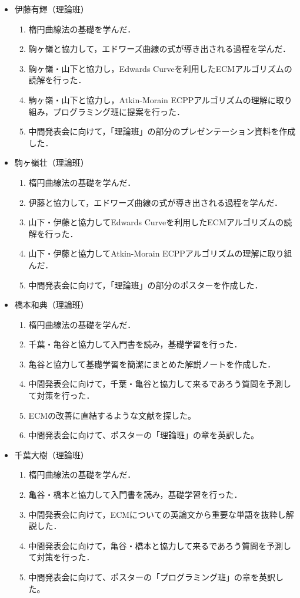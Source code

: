 \documentclass[openany,11pt,papersize]{jsbook}
\begin{document}
\begin{itemize}
\item 伊藤有輝（理論班）
 \begin{enumerate}
 \renewcommand{\labelenumi}{(\arabic{enumi})}
 \item 楕円曲線法の基礎を学んだ．
 \item 駒ヶ嶺と協力して，エドワーズ曲線の式が導き出される過程を学んだ．
 \item 駒ヶ嶺・山下と協力し，Edwards Curveを利用したECMアルゴリズムの読解を行った．
 \item 駒ヶ嶺・山下と協力し，Atkin-Morain ECPPアルゴリズムの理解に取り組み，プログラミング班に提案を行った．
 \item 中間発表会に向けて，「理論班」の部分のプレゼンテーション資料を作成した．
 \end{enumerate}
 
\item 駒ヶ嶺壮（理論班）
 \begin{enumerate}
 \renewcommand{\labelenumi}{(\arabic{enumi})}
 \item 楕円曲線法の基礎を学んだ．
 \item 伊藤と協力して，エドワーズ曲線の式が導き出される過程を学んだ．
 \item 山下・伊藤と協力してEdwards Curveを利用したECMアルゴリズムの読解を行った．
 \item 山下・伊藤と協力してAtkin-Morain ECPPアルゴリズムの理解に取り組んだ．
 \item 中間発表会に向けて，「理論班」の部分のポスターを作成した．
 \end{enumerate}
 
\item 橋本和典（理論班）
 \begin{enumerate}
 \renewcommand{\labelenumi}{(\arabic{enumi})}
 \item 楕円曲線法の基礎を学んだ．
 \item 千葉・亀谷と協力して入門書を読み，基礎学習を行った．
 \item 亀谷と協力して基礎学習を簡潔にまとめた解説ノートを作成した．
 \item 中間発表会に向けて，千葉・亀谷と協力して来るであろう質問を予測して対策を行った．
 \item ECMの改善に直結するような文献を探した。
 \item 中間発表会に向けて、ポスターの「理論班」の章を英訳した。
 \end{enumerate}
 
\item 千葉大樹（理論班）
 \begin{enumerate}
 \renewcommand{\labelenumi}{(\arabic{enumi})}
 \item 楕円曲線法の基礎を学んだ．
 \item 亀谷・橋本と協力して入門書を読み，基礎学習を行った．
 \item 中間発表会に向けて，ECMについての英論文から重要な単語を抜粋し解説した．
 \item 中間発表会に向けて，亀谷・橋本と協力して来るであろう質問を予測して対策を行った．
 \item 中間発表会に向けて、ポスターの「プログラミング班」の章を英訳した。
 \end{enumerate}
 

\end{itemize}
\end{document}

